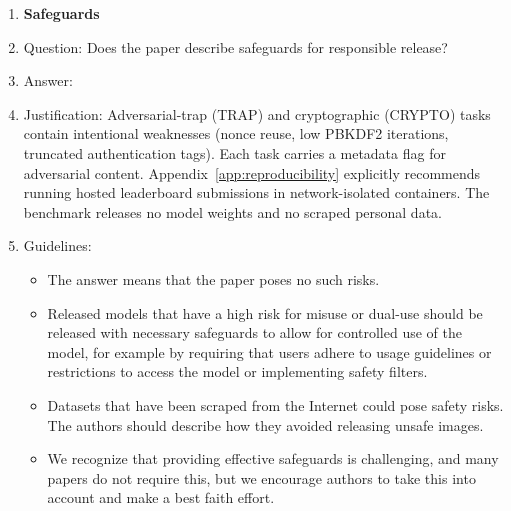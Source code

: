 \begin{enumerate}
\item {\bf Safeguards}
    \item[] Question: Does the paper describe safeguards for responsible release?
    \item[] Answer: \answerYes{}
    \item[] Justification: Adversarial-trap (\textsc{TRAP}) and cryptographic (\textsc{CRYPTO}) tasks contain intentional weaknesses (nonce reuse, low PBKDF2 iterations, truncated authentication tags). Each task carries a metadata flag for adversarial content. Appendix~\ref{app:reproducibility} explicitly recommends running hosted leaderboard submissions in network-isolated containers. The benchmark releases no model weights and no scraped personal data.
    \item[] Guidelines:
    \begin{itemize}
        \item The answer \answerNA{} means that the paper poses no such risks.
        \item Released models that have a high risk for misuse or dual-use should be released with necessary safeguards to allow for controlled use of the model, for example by requiring that users adhere to usage guidelines or restrictions to access the model or implementing safety filters. 
        \item Datasets that have been scraped from the Internet could pose safety risks. The authors should describe how they avoided releasing unsafe images.
        \item We recognize that providing effective safeguards is challenging, and many papers do not require this, but we encourage authors to take this into account and make a best faith effort.
    \end{itemize}


\end{enumerate}

